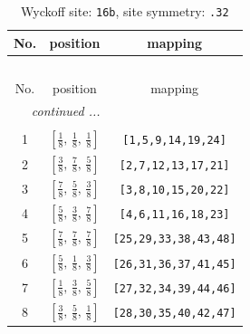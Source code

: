 \documentclass[fleqn,8pt]{jsarticle}
\begin{document}
\begin{longtable}{ccc}
\caption{Wyckoff site: {\tt 16b}, site symmetry: {\tt .32}}
 \\
 \hline \hline
No. & position & mapping \\ \hline \endfirsthead

\multicolumn{2}{l}{\tablename\ \thetable{}} \\
 \hline \hline
No. & position & mapping \\ \hline \endhead

 \hline \hline
\multicolumn{2}{r}{\footnotesize\it continued ...} \\ \endfoot

 \hline \hline
\multicolumn{2}{r}{} \\ \endlastfoot

1 & $\left[ \frac{1}{8},\, \frac{1}{8},\, \frac{1}{8} \right]$ & {\tt [1,5,9,14,19,24]} \\ \hline
2 & $\left[ \frac{3}{8},\, \frac{7}{8},\, \frac{5}{8} \right]$ & {\tt [2,7,12,13,17,21]} \\ \hline
3 & $\left[ \frac{7}{8},\, \frac{5}{8},\, \frac{3}{8} \right]$ & {\tt [3,8,10,15,20,22]} \\ \hline
4 & $\left[ \frac{5}{8},\, \frac{3}{8},\, \frac{7}{8} \right]$ & {\tt [4,6,11,16,18,23]} \\ \hline
5 & $\left[ \frac{7}{8},\, \frac{7}{8},\, \frac{7}{8} \right]$ & {\tt [25,29,33,38,43,48]} \\ \hline
6 & $\left[ \frac{5}{8},\, \frac{1}{8},\, \frac{3}{8} \right]$ & {\tt [26,31,36,37,41,45]} \\ \hline
7 & $\left[ \frac{1}{8},\, \frac{3}{8},\, \frac{5}{8} \right]$ & {\tt [27,32,34,39,44,46]} \\ \hline
8 & $\left[ \frac{3}{8},\, \frac{5}{8},\, \frac{1}{8} \right]$ & {\tt [28,30,35,40,42,47]} \\
\end{longtable}
\renewcommand{\arraystretch}{1.2}
\end{document}
